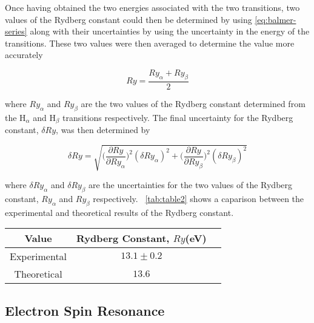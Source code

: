 \documentclass{article}
\newcommand{\tabref}[2][\tablename~]{#1\ref{#2}}
\begin{document}
\vspace{2mm}
\noindent
Once having obtained the two energies associated with the two transitions, two values of the Rydberg constant could then be determined by using \eqref{eq:balmer-series} along with their uncertainties by using the uncertainty in the energy of the transitions. These two values were then averaged to determine the value more accurately

\begin{equation}
\label{eq:Rydberg-const}
Ry = \frac{Ry_{\alpha} + Ry_{\beta}}{2}
\end{equation}

\vspace{2mm}
\noindent
where $Ry_{\alpha}$ and $Ry_{\beta}$ are the two values of the Rydberg constant determined from the H$_\alpha$ and H$_\beta$ transitions respectively. The final uncertainty for the Rydberg constant, $\delta Ry$, was then determined by

\begin{equation}
\label{eq:Rydberg-error}
\delta Ry = \sqrt{\bigg(\frac{\partial{Ry}}{\partial{Ry_{\alpha}}}\bigg)^2 (\delta Ry_{\alpha})^2 + \bigg(\frac{\partial{Ry}}{\partial{Ry_{\beta}}}\bigg)^2 (\delta Ry_{\beta})^2}
\end{equation}

\vspace{2mm}
\noindent
where $\delta Ry_{\alpha}$ and $\delta Ry_{\beta}$ are the uncertainties for the two values of the Rydberg constant,  $Ry_{\alpha}$ and $Ry_{\beta}$ respectively. \tabref{tab:table2} shows a caparison between the experimental and theoretical results of the Rydberg constant.

\vspace{5mm}
\begin{table*}[h]
\centering %
\caption{Table of Calculated Values and Published Values for the Rydberg Constant}
\label{tab:table2}
\begin{tabular}{|c|c|c|}
\hline
Value & Rydberg Constant, $Ry$(eV) \\
\hline
Experimental & $13.1 \pm 0.2$ \\
\hline
Theoretical \cite{Paper01} & $13.6$ \\
\hline
\end{tabular}
\end{table*}

\subsection{Electron Spin Resonance}
\label{ssec:electron-results}
\end{document}
